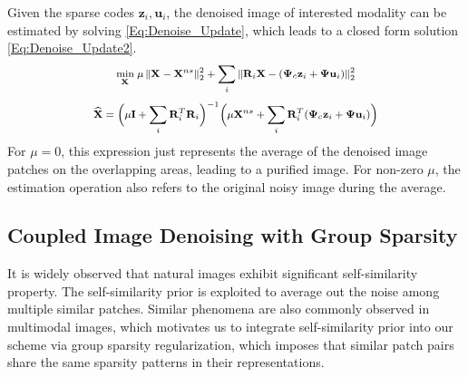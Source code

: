 \documentclass{article}
\newcommand{\mypar}[1]{\bigskip\noindent {\bf #1.}}
\begin{document}
\mypar{Step 2: Reconstruction}
Given the sparse codes $\mathbf{z}_i,\mathbf{u}_i$, the denoised image of interested modality can be estimated by solving \eqref{Eq:Denoise_Update}, which leads to a closed form solution \eqref{Eq:Denoise_Update2}.
\begin{equation} \label{Eq:Denoise_Update}
\footnotesize
\underset{\mathbf{X}_{} }{\min} \;
\mu \left\| \mathbf{X}_{} - \mathbf{X}^{ns}_{} \right\|_2^2
+
\sum_i
\left\| \mathbf{R}_i \mathbf{X} - ( \boldsymbol{\Psi}_{c} \mathbf{z}_i + \boldsymbol{\Psi} \mathbf{u}_i) \right\|_2^2
\end{equation}
%
\begin{equation} \label{Eq:Denoise_Update2}
\footnotesize
\mathbf{\widehat{X}} = \Big( \mu \mathbf{I} + \sum_{i} \mathbf{R}_i^T \mathbf{R}_i \Big)^{-1} 
\Big( \mu \mathbf{X}^{ns} + \sum_i \mathbf{R}_i^T (\boldsymbol{\Psi}_{c} \mathbf{z}_i + \boldsymbol{\Psi} \mathbf{u}_i) \Big) 
\end{equation} 
For $\mu = 0$, this expression just represents the average of the denoised image patches on the overlapping areas, leading to a purified image. For non-zero $\mu$, the estimation operation also refers to the original noisy image during the average.




\subsection{Coupled Image Denoising with Group Sparsity}
It is widely observed that natural images exhibit significant self-similarity property. The self-similarity prior is exploited to average out the noise among multiple similar patches\cite{dabov2007image,mairal2009non}. Similar phenomena are also commonly observed in multimodal images, which motivates us to integrate self-similarity prior into our scheme via group sparsity regularization, which imposes that similar patch pairs share the same sparsity patterns in their representations.

\end{document}
